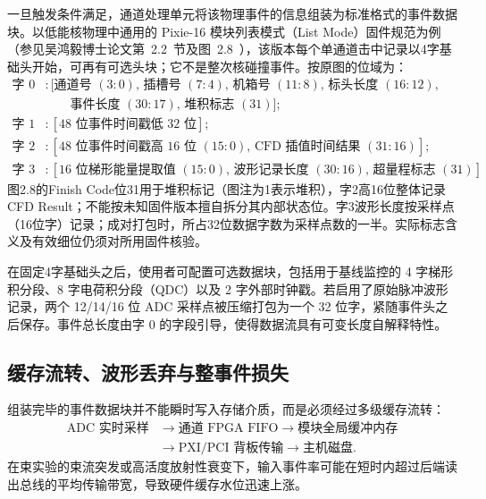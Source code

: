 一旦触发条件满足，通道处理单元将该物理事件的信息组装为标准格式的事件数据块。以低能核物理中通用的 Pixie-16 模块列表模式（List Mode）固件规范为例（参见吴鸿毅博士论文第~2.2~节及图~2.8~\cite[印刷第~42--43~页]{wu-hongyi-2020-general-purpose-digital-daq-thesis}），该版本每个单通道击中记录以4字基础头开始，可再有可选头块；它不是整次核碰撞事件。按原图的位域为：
\begin{align}
\text{字 } 0 &: [\text{通道号 } (3:0), \, \text{插槽号 } (7:4), \, \text{机箱号 } (11:8), \, \text{标头长度 } (16:12), \nonumber \\
&\quad\quad \text{事件长度 } (30:17), \, \text{堆积标志 } (31)]; \label{eq:5-5-word0} \\
\text{字 } 1 &: [48\text{ 位事件时间戳低 } 32\text{ 位}]; \label{eq:5-5-word1} \\
\text{字 } 2 &: [48\text{ 位事件时间戳高 } 16\text{ 位 } (15:0), \, \text{CFD 插值时间结果 } (31:16)]; \label{eq:5-5-word2} \\
\text{字 } 3 &: [16\text{ 位梯形能量提取值 } (15:0), \, \text{波形记录长度 } (30:16), \, \text{超量程标志 } (31)]. \label{eq:5-5-word3}
\end{align}
图2.8的Finish Code位31用于堆积标记（图注为1表示堆积），字2高16位整体记录CFD Result；不能按未知固件版本擅自拆分其内部状态位。字3波形长度按采样点（16位字）记录；成对打包时，所占32位数据字数为采样点数的一半。实际标志含义及有效细位仍须对所用固件核验。

在固定4字基础头之后，使用者可配置可选数据块，包括用于基线监控的 4 字梯形积分段、8 字电荷积分段（QDC）以及 2 字外部时钟戳。若启用了原始脉冲波形记录，两个 12/14/16 位 ADC 采样点被压缩打包为一个 32 位字，紧随事件头之后保存。事件总长度由字 0 的字段引导，使得数据流具有可变长度自解释特性。

\subsection{缓存流转、波形丢弃与整事件损失}\label{subsec:5-5-2}

组装完毕的事件数据块并不能瞬时写入存储介质，而是必须经过多级缓存流转：
\begin{align*}
\text{ADC 实时采样} &\longrightarrow \text{通道 FPGA FIFO} \longrightarrow \text{模块全局缓冲内存} \\
&\longrightarrow \text{PXI/PCI 背板传输} \longrightarrow \text{主机磁盘}.
\end{align*}
在束实验的束流突发或高活度放射性衰变下，输入事件率可能在短时内超过后端读出总线的平均传输带宽，导致硬件缓存水位迅速上涨。

